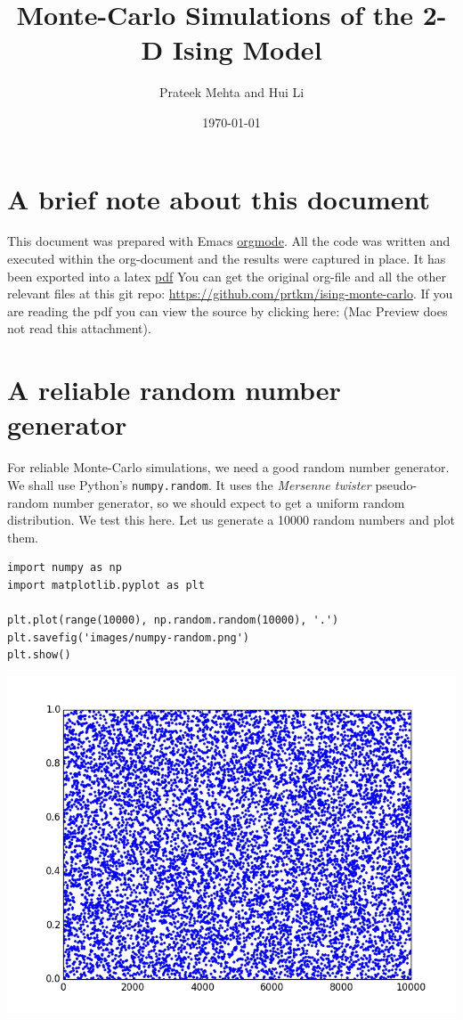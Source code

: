 \documentclass{article}
\author{Prateek Mehta and Hui Li}
\date{\today}
\title{Monte-Carlo Simulations of the 2-D Ising Model}
\begin{document}
\maketitle
\tableofcontents

\section{A brief note about this document}
\label{sec-1}

This document was prepared with Emacs \href{http://orgmode.org}{orgmode}. All the code was written and executed within the org-document and the results were captured in place. It has been exported into a latex \href{./ising-monte-carlo.pdf}{pdf} You can get the original org-file and all the other relevant files at this git repo: \url{https://github.com/prtkm/ising-monte-carlo}. If you are reading the pdf you can view the source by clicking here:  (Mac Preview does not read this attachment).


\section{A reliable random number generator}
\label{sec-2}

For reliable Monte-Carlo simulations, we need a good random number generator. We shall use  Python's \texttt{numpy.random}. It uses the \emph{Mersenne twister} pseudo-random number generator, so we should expect to get a uniform random distribution. We test this here. Let us generate a 10000 random numbers and plot them.

\begin{verbatim}
import numpy as np
import matplotlib.pyplot as plt

plt.plot(range(10000), np.random.random(10000), '.')
plt.savefig('images/numpy-random.png')
plt.show()
\end{verbatim}

\includegraphics[width=.9\linewidth]{./images/numpy-random.png}
\end{document}
